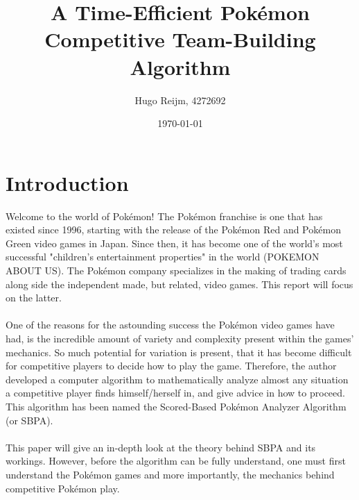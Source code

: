 \documentclass{article}
\title{A Time-Efficient Pok\'emon Competitive Team-Building Algorithm}
\author{Hugo Reijm, 4272692}
\date{\today}
\begin{document}
\maketitle
\newpage
\tableofcontents

\newpage
\section{Introduction}
Welcome to the world of Pok\'emon! The Pok\'emon franchise is one that has existed since 1996, starting with the release of the Pok\'emon Red and Pok\'emon Green video games in Japan. Since then, it has become one of the world's most successful "children's entertainment properties" in the world (POKEMON ABOUT US). The Pok\'emon  company specializes in the making of trading cards along side the independent made, but related, video games. This report will focus on the latter.\\\\
One of the reasons for the astounding success the Pok\'emon video games have had, is the incredible amount of variety and complexity present within the games' mechanics. So much potential for variation is present, that it has become difficult for competitive players to decide how to play the game. Therefore, the author developed a computer algorithm to mathematically analyze almost any situation a competitive player finds himself/herself in, and give advice in how to proceed. This algorithm has been named the Scored-Based Pok\'emon Analyzer Algorithm (or SBPA).\\\\
This paper will give an in-depth look at the theory behind SBPA and its workings. However, before the algorithm can be fully understand, one must first understand the Pok\'emon games and more importantly, the mechanics behind competitive Pok\'emon play.
\end{document}

